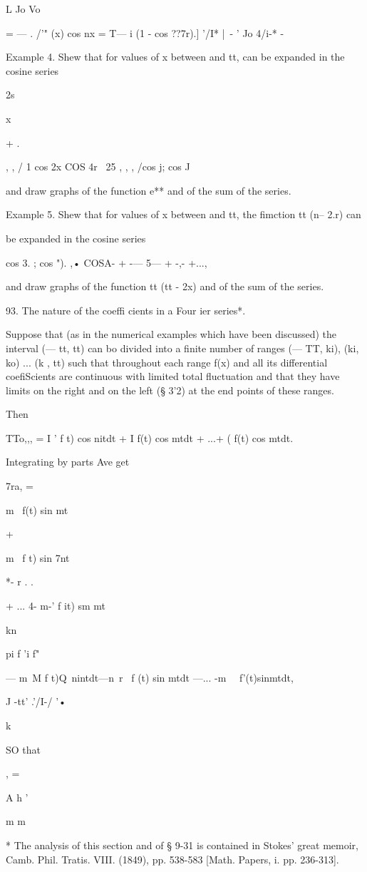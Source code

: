  L Jo Vo

= — . /'" (x) cos nx = T— i (1 - cos ??7r).] '/I* |\ - ' Jo 4/i-* -

Example 4. Shew that for values of x between and tt, can be expanded
in the cosine series

2s

 x

+ .

, , / 1 cos 2x COS 4r \ 25 , , , /cos j; cos J

and draw graphs of the function e** and of the sum of the series.

Example 5. Shew that for values of x between and tt, the fimction tt
(n-- 2.r) can

be expanded in the cosine series

cos 3. ; cos "). ,• COSA- + -— 5— + -,- +...,

and draw graphs of the function tt (tt - 2x) and of the sum of the
series.

93. The nature of the coeffi cients in a Four ier series*.

Suppose that (as in the numerical examples which have been discussed)
the interval (— tt, tt) can bo divided into a finite number of ranges
(— TT, ki), (ki, ko) ... (k , tt) such that throughout each range f(x)
and all its differential coefiScients are continuous with limited
total fluctuation and that they have limits on the right and on the
left (§ 3'2) at the end points of these ranges.

Then

TTo,,, = I ' f t) cos nitdt + I f(t) cos mtdt + ...+ ( f(t) cos mtdt.

Integrating by parts Ave get

7ra, =

m~ f(t) sin mt

+

m~ f t) sin 7nt

*- r . .

+ ... 4- m-' f it) sm mt

kn

pi f 'i f"

— m~M f t)Q\ nintdt—n\ r \ f (t) sin mtdt —... -m~ \ f'(t)sinmtdt,

J -tt' .'/I-/ '•

k

SO that

 , =

A h '

m m

* The analysis of this section and of § 9-31 is contained in Stokes'
great memoir, Camb. Phil. Tratis. VIII. (1849), pp. 538-583 [Math.
Papers, i. pp. 236-313].

